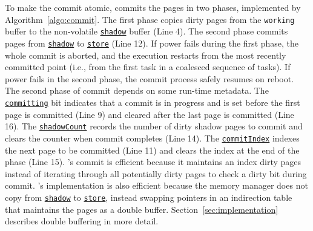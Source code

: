 To make the commit atomic, \sys commits the pages in two phases, implemented by
Algorithm~\ref{algo:commit}.
%
The first phase copies dirty pages from the \texttt{working} buffer to the
non-volatile \texttt{\underline{shadow}} buffer (Line 4). The second phase
commits pages from \texttt{\underline{shadow}} to \texttt{\underline{store}}
(Line 12).  If power fails during the first phase, the whole commit is aborted,
and the execution restarts from the most recently committed point (i.e., from
the first task in a coalesced sequence of tasks). If power fails in the second
phase, the commit process safely resumes on reboot.  The second phase of commit
depends on some run-time metadata. The \texttt{\underline{committing}} bit
indicates that a commit is in progress and is set before the first page is
committed (Line 9) and cleared after the last page is committed (Line 16).  The
\texttt{\underline{shadowCount}} records the number of dirty shadow pages to
commit and \sys clears the counter when commit completes (Line 14).  The
\texttt{\underline{commitIndex}} indexes the next page to be committed (Line
11) and \sys clears the index at the end of the phase (Line 15).
%
\sys's commit is efficient because it maintains an index dirty pages instead of
iterating through all potentially dirty pages to check a dirty bit during
commit. 
%
\sys's implementation is also efficient because the memory manager does not
copy from \texttt{\underline{shadow}} to \texttt{\underline{store}}, instead
swapping pointers in an indirection table that maintains the pages as a double
buffer.  Section~\ref{sec:implementation} describes double buffering in more
detail.

%

